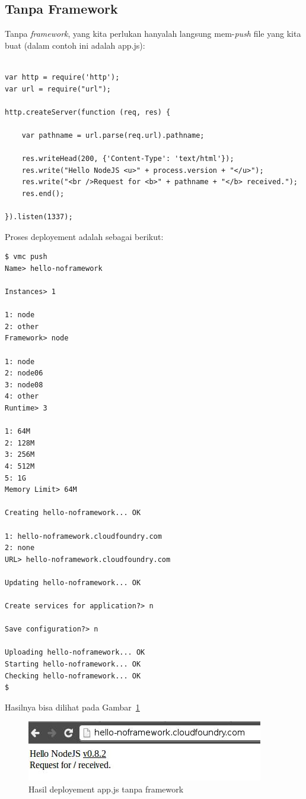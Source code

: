 \subsection{Tanpa Framework}

Tanpa \textit{framework}, yang kita perlukan hanyalah langsung mem-\textit{push} file yang kita buat (dalam contoh ini adalah app.js):

\lstset{language=Javascript,caption=app.js tanpa framework}
\begin{lstlisting}

var http = require('http'); 
var url = require("url"); 

http.createServer(function (req, res) { 

    var pathname = url.parse(req.url).pathname; 

    res.writeHead(200, {'Content-Type': 'text/html'}); 
    res.write("Hello NodeJS <u>" + process.version + "</u>"); 
    res.write("<br />Request for <b>" + pathname + "</b> received."); 
    res.end(); 

}).listen(1337);
\end{lstlisting}

Proses deployement adalah sebagai berikut:

\lstset{language=bash,caption=Deployment app.js tanpa framework}
\begin{lstlisting}
$ vmc push
Name> hello-noframework

Instances> 1

1: node
2: other
Framework> node

1: node
2: node06
3: node08
4: other
Runtime> 3

1: 64M
2: 128M
3: 256M
4: 512M
5: 1G
Memory Limit> 64M

Creating hello-noframework... OK

1: hello-noframework.cloudfoundry.com
2: none
URL> hello-noframework.cloudfoundry.com

Updating hello-noframework... OK

Create services for application?> n

Save configuration?> n

Uploading hello-noframework... OK
Starting hello-noframework... OK
Checking hello-noframework... OK
$
\end{lstlisting}

Hasilnya bisa dilihat pada Gambar~\ref{fig:modul1-hello-no-framework}

  \begin{figure}
    \begin{center}
      \includegraphics[scale=0.5]{images/hello-noframework.jpg}
    \end{center}
    \caption{Hasil deployement app.js tanpa framework}
    \label{fig:modul1-hello-no-framework}
  \end{figure}
